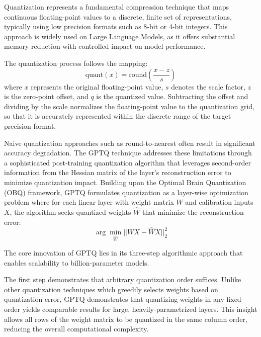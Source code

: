 Quantization represents a fundamental compression technique that maps continuous floating-point values to a discrete, finite set of representations, typically using low precision formats such as 8-bit or 4-bit integers. This approach is widely used on Large Language Models, as it offers substantial memory reduction with controlled impact on model performance.

The quantization process follows the mapping:
\begin{equation}
\text{quant}(x) = \text{round}\left(\frac{x - z}{s}\right)
\end{equation}
where $x$ represents the original floating-point value, $s$ denotes the scale factor, $z$ is the zero-point offset, and $q$ is the quantized value. Subtracting the offset and dividing by the scale normalizes the floating-point value to the quantization grid, so that it is accurately represented within the discrete range of the target precision format.

Naive quantization approaches such as round-to-nearest often result in significant accuracy degradation. The GPTQ technique \cite{gptq_quantization} addresses these limitations through a sophisticated post-training quantization algorithm that leverages second-order information from the Hessian matrix of the layer's reconstruction error to minimize quantization impact. Building upon the Optimal Brain Quantization (OBQ) framework, GPTQ formulates quantization as a layer-wise optimization problem where for each linear layer with weight matrix $W$ and calibration inputs $X$, the algorithm seeks quantized weights $\hat{W}$ that minimize the reconstruction error:
\begin{equation}
\arg\min_{\hat{W}} ||WX - \hat{W}X||_2^2
\end{equation}

The core innovation of GPTQ lies in its three-step algorithmic approach that enables scalability to billion-parameter models.

The first step demonstrates that arbitrary quantization order suffices. Unlike other quantization techniques which greedily selects weights based on quantization error, GPTQ demonstrates that quantizing weights in any fixed order yields comparable results for large, heavily-parametrized layers. This insight allows all rows of the weight matrix to be quantized in the same column order, reducing the overall computational complexity.

